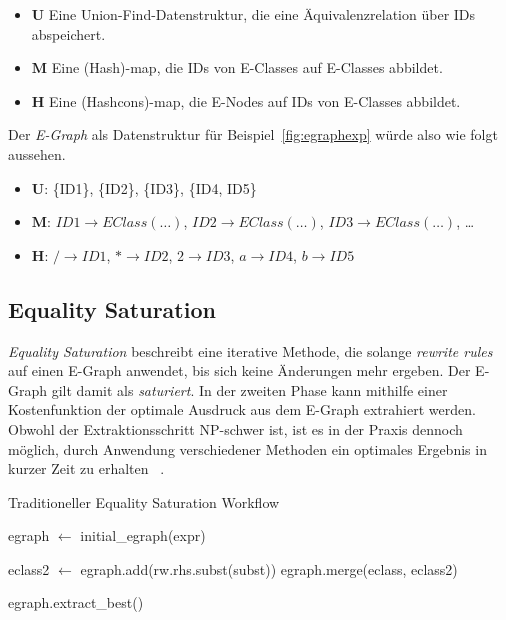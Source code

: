 \begin{itemize}
  \item $\mathbf{U}$ Eine Union-Find-Datenstruktur, die eine Äquivalenzrelation über IDs abspeichert.
  \item $\mathbf{M}$ Eine (Hash)-map, die IDs von E-Classes auf E-Classes abbildet. 
  \item $\mathbf{H}$ Eine (Hashcons)-map, die E-Nodes auf IDs von E-Classes abbildet.
\end{itemize}

Der \textit{E-Graph} als Datenstruktur für Beispiel~\ref{fig:egraphexp} würde also wie folgt aussehen.

\begin{itemize}
  \item $\mathbf{U}$: \{ID1\}, \{ID2\}, \{ID3\}, \{ID4, ID5\} 
  \item $\mathbf{M}$: $ID1 \rightarrow EClass(\ldots)$, $ID2 \rightarrow EClass(\ldots)$, $ID3 \rightarrow EClass(\ldots)$, \ldots 
  \item $\mathbf{H}$: $/ \rightarrow ID1$, $* \rightarrow ID2$, $2 \rightarrow ID3$, $a \rightarrow ID4$, $b \rightarrow ID5$
\end{itemize}



\subsection{Equality Saturation}

\textit{Equality Saturation} beschreibt eine iterative Methode, die solange \textit{rewrite rules} auf einen E-Graph anwendet, bis sich keine Änderungen mehr ergeben. 
Der E-Graph gilt damit als \textit{saturiert}.
In der zweiten Phase kann mithilfe einer Kostenfunktion der optimale Ausdruck aus dem E-Graph extrahiert werden.
Obwohl der Extraktionsschritt NP-schwer ist, ist es in der Praxis dennoch möglich, durch Anwendung verschiedener Methoden ein optimales Ergebnis in kurzer Zeit zu erhalten
~\cite{phaseorder-2009}. 


\begin{algorithm}[H]
  \caption{Traditioneller Equality Saturation Workflow}\label{alg:eqsat}
  \begin{algorithmic}
    \State egraph $\gets$ initial\_egraph(expr)
    
      
          \State  eclass2 $\gets$ egraph.add(rw.rhs.subst(subst))
          \State egraph.merge(eclass, eclass2)
        \EndFor 
      \EndFor
    \EndWhile

    \State \Return egraph.extract\_best()
    \EndFunction
  \end{algorithmic}
\end{algorithm}
